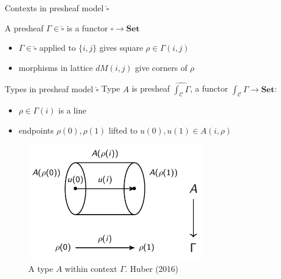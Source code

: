 \documentclass[english]{beamer}
\newcommand{\incfig}[1]{%
    \def\svgwidth{\columnwidth}
    {#1.pdf_tex}
}
\begin{document}
\begin{frame}{Contexts in presheaf model $\widehat{\square}$}
 

    \begin{example}
        A presheaf $\Gamma \in \widehat{\square}$ is a functor $\square \rightarrow \mathbf{Set}$

        \begin{itemize}
            \item $\Gamma \in \widehat{\square}$ applied to $\{i,j\}$ gives square $\rho \in \Gamma (i,j)$
            \item morphisms in lattice $dM(i,j)$ give corners of $\rho$

        \end{itemize}
        \begin{figure}
            
            
        \end{figure}
    \end{example}
 
\end{frame}

\begin{frame}{Types in presheaf model $\widehat{\square}$}
    Type $A$ is presheaf $\widehat{\int_{\mathcal{C}} \Gamma}$, a functor $\int_{\mathcal{C}} \Gamma \rightarrow \mathbf{Set}$:

    \begin{itemize}
        \item $\rho \in \Gamma (i)$ is a line
        \item endpoints $\rho (0), \rho (1)$ lifted to $u(0),u(1) \in A(i,\rho)$
    \end{itemize}

 \begin{figure}
\centering
\includegraphics[width=0.7\textwidth]{figures/types}
\caption{A type $A$ within context $\Gamma$. Huber (2016)}
 \end{figure}
 
\end{frame}
\end{document}
